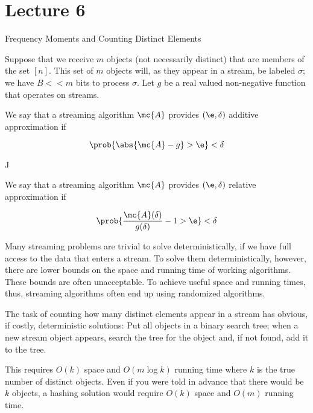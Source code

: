 \documentclass[../main.tex]{subfiles}
\begin{document}
\section{Lecture 6}{Frequency Moments and Counting Distinct Elements}

\begin{definition}
    Suppose that we receive $m$ objects (not necessarily
    distinct) that are members of the set $[n]$.
    This set of $m$ objects will, as they appear in a stream,
    be labeled $\sigma$; we have $B << m$ bits to process
    $\sigma$. Let $g$
    be a real valued non-negative function that operates on
    streams.
\end{definition}
\begin{definition}
    We say that a streaming algorithm $\mc{A}$ provides 
    $(\e, \delta)$ additive approximation if

    \[
        \prob{\abs{\mc{A} - g} > \e} < \delta
    \]
\end{definition}
J
\begin{definition}
    We say that a streaming algorithm $\mc{A}$ provides 
    $(\e, \delta)$ relative approximation if

    \[
        \prob{\frac{\mc{A}(\delta)}{g(\delta)} - 1 > \e} < \delta
    \]
\end{definition}

\begin{remark}
    Many streaming problems are trivial to solve deterministically, if we have full access to the data that enters a stream. To solve them deterministically, however, there are lower bounds on the space and running time of working algorithms. These bounds are often unacceptable. To achieve useful space and running times, thus, streaming algorithms often end up using randomized algorithms.
\end{remark}

\begin{remark}
    The task of counting how many distinct elements appear in a stream has obvious, if costly, deterministic solutions: Put all objects in a binary search tree; when a new stream object appears, search the tree for the object and, if not found, add it to the tree.

    This requires $O(k)$ space and $O(m \log k)$ running time where $k$ is the true number of distinct objects. Even if you were told in advance that there would be $k$ objects, a hashing solution would require $O(k)$ space and $O(m)$ running time.
\end{remark}
\end{document}
